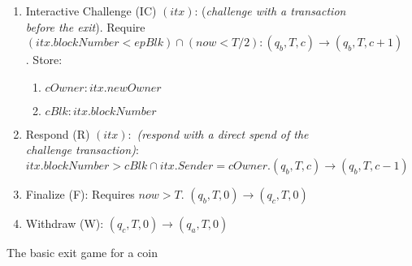 \begin{figure}
\begin{minipage}{\columnwidth}
\begin{framed}
\begin{enumerate}
\begin{enumerate}
            \end{enumerate}
        \item Interactive Challenge (IC) $(itx)$: (\textit{challenge with a transaction before the exit}). Require $(itx.blockNumber < epBlk) \cap (now < T/2): (q_b, T, c) \rightarrow (q_b, T, c+1)$. Store: 
            \begin{enumerate}
                \item $cOwner: itx.newOwner$ 
                \item $cBlk: itx.blockNumber$ 
            \end{enumerate}
        \item Respond (R) $(itx):$ \textit{(respond with a direct spend of the challenge transaction)}: $itx.blockNumber > cBlk \cap itx.Sender = cOwner. (q_b, T, c) \rightarrow (q_b, T, c-1)$
        \item Finalize (F): Requires $now > T$. $(q_b, T, 0) \rightarrow (q_c, T, 0)$
        \item Withdraw (W): $(q_c, T, 0) \rightarrow (q_a, T, 0)$
    \end{enumerate}

\end{framed}
\end{minipage}
\caption{The basic exit game for a coin}
\label{fig:transfer_coin}
\end{figure}
